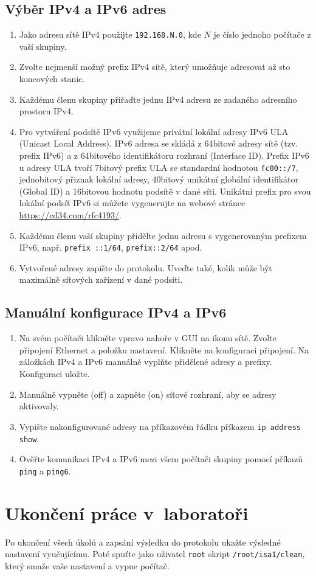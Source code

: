\documentclass[a4paper,11pt]{article}
\begin{document}
\subsection{Výběr IPv4 a IPv6 adres}
\begin{enumerate}
    \item Jako adresu sítě IPv4 použijte \texttt{192.168.N.0}, kde $N$ je číslo jednoho počítače z vaší skupiny. 
    \item Zvolte nejmenší možný prefix IPv4 sítě, který umožňuje adresovat až sto koncových stanic.
    \item Každému členu skupiny přiřaďte jednu IPv4 adresu ze zadaného adresního prostoru IPv4.
    \item Pro vytváření podsítě IPv6 využijeme privátní lokální adresy IPv6 ULA (Unicast Local Address). IPv6 adresa se skládá z 64bitové adresy sítě (tzv. prefix IPv6) a z 64bitového identifikátoru rozhraní (Interface ID). Prefix IPv6 u adresy ULA tvoří 7bitový prefix ULA se standardní hodnotou {\tt fc00::/7}, jednobitový přiznak lokální adresy, 40bitový unikátní globální identifikátor (Global ID) a 16bitovou hodnotu podsítě v dané síti. Unikátní prefix pro svou lokální podsíť IPv6 si můžete vygenerujte  na webové stránce \url{https://cd34.com/rfc4193/}.
    \item Každému členu vaší skupiny přidělte jednu adresu s vygenerovaným prefixem IPv6, např. {\tt prefix ::1/64}, {\tt prefix::2/64} apod.
    \item Vytvořené adresy zapište do protokolu. Uveďte také, kolik může být maximálně síťových zařízení v dané podsíti.
\end{enumerate}

\subsection{Manuální konfigurace IPv4 a IPv6}

\begin{enumerate}
    \item Na svém počítači klikněte vpravo nahoře v GUI na ikonu sítě. Zvolte připojení Ethernet a položku nastavení.
      Klikněte na konfiguraci připojení. Na záložkách IPv4 a IPv6  manuálně vyplňte přidělené adresy a prefixy. Konfiguraci uložte.
    \item Manuálně vypněte (off) a zapněte (on) síťové rozhraní, aby se adresy aktivovaly.
    \item Vypište nakonfigurované adresy na příkazovém řádku příkazem {\tt ip address show}.
    \item Ověřte komunikaci IPv4 a IPv6 mezi všem počítači skupiny pomocí příkazů {\tt ping} a {\tt ping6}.
\end{enumerate}

\section{Ukončení práce v~laboratoři}
Po ukončení všech úkolů a zapsání výsledku do protokolu ukažte výsledné nastavení vyučujícímu. Poté spuťte jako uživatel {\tt root} skript {\tt /root/isa1/clean}, který smaže vaše nastavení a vypne počítač.
\end{document}
